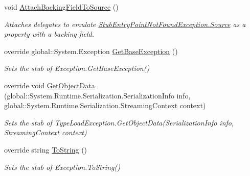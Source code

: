 \begin{DoxyCompactItemize}
void \hyperlink{class_system_1_1_fakes_1_1_stub_entry_point_not_found_exception_ac277ea9e59fb1bb4e6d7a9b231962cf2}{Attach\-Backing\-Field\-To\-Source} ()
\begin{DoxyCompactList}\small\item\em Attaches delegates to emulate \hyperlink{class_system_1_1_fakes_1_1_stub_entry_point_not_found_exception_a2d152ae022fca026c307b8b064bf577c}{Stub\-Entry\-Point\-Not\-Found\-Exception.\-Source} as a property with a backing field.\end{DoxyCompactList}\item 
override global\-::\-System.\-Exception \hyperlink{class_system_1_1_fakes_1_1_stub_entry_point_not_found_exception_a8fd6e669b2974a1ef8a24b2335c72f94}{Get\-Base\-Exception} ()
\begin{DoxyCompactList}\small\item\em Sets the stub of Exception.\-Get\-Base\-Exception()\end{DoxyCompactList}\item 
override void \hyperlink{class_system_1_1_fakes_1_1_stub_entry_point_not_found_exception_ae0c73178fc3cfce6a335e7c49dd9e7a4}{Get\-Object\-Data} (global\-::\-System.\-Runtime.\-Serialization.\-Serialization\-Info info, global\-::\-System.\-Runtime.\-Serialization.\-Streaming\-Context context)
\begin{DoxyCompactList}\small\item\em Sets the stub of Type\-Load\-Exception.\-Get\-Object\-Data(\-Serialization\-Info info, Streaming\-Context context)\end{DoxyCompactList}\item 
override string \hyperlink{class_system_1_1_fakes_1_1_stub_entry_point_not_found_exception_a57cb4ab87501c40ae3ed2f3f913c1773}{To\-String} ()
\begin{DoxyCompactList}\small\item\em Sets the stub of Exception.\-To\-String()\end{DoxyCompactList}\end{DoxyCompactItemize}
